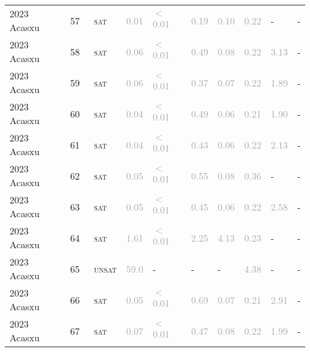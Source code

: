 \begin{center}
{\begin{longtable}{@{}llllllllll@{}}
2023 Acasxu & 57 & ~\textsc{sat} & \textcolor{darkgray}{0.01} & \textcolor{darkgray}{$<$0.01} & \textcolor{darkgray}{0.19} & \textcolor{darkgray}{0.10} & \textcolor{darkgray}{0.22} & - & - \\
2023 Acasxu & 58 & ~\textsc{sat} & \textcolor{darkgray}{0.06} & \textcolor{darkgray}{$<$0.01} & \textcolor{darkgray}{0.49} & \textcolor{darkgray}{0.08} & \textcolor{darkgray}{0.22} & \textcolor{darkgray}{3.13} & - \\
2023 Acasxu & 59 & ~\textsc{sat} & \textcolor{darkgray}{0.06} & \textcolor{darkgray}{$<$0.01} & \textcolor{darkgray}{0.37} & \textcolor{darkgray}{0.07} & \textcolor{darkgray}{0.22} & \textcolor{darkgray}{1.89} & - \\
2023 Acasxu & 60 & ~\textsc{sat} & \textcolor{darkgray}{0.04} & \textcolor{darkgray}{$<$0.01} & \textcolor{darkgray}{0.49} & \textcolor{darkgray}{0.06} & \textcolor{darkgray}{0.21} & \textcolor{darkgray}{1.90} & - \\
2023 Acasxu & 61 & ~\textsc{sat} & \textcolor{darkgray}{0.04} & \textcolor{darkgray}{$<$0.01} & \textcolor{darkgray}{0.43} & \textcolor{darkgray}{0.06} & \textcolor{darkgray}{0.22} & \textcolor{darkgray}{2.13} & - \\
2023 Acasxu & 62 & ~\textsc{sat} & \textcolor{darkgray}{0.05} & \textcolor{darkgray}{$<$0.01} & \textcolor{darkgray}{0.55} & \textcolor{darkgray}{0.08} & \textcolor{darkgray}{0.36} & - & - \\
2023 Acasxu & 63 & ~\textsc{sat} & \textcolor{darkgray}{0.05} & \textcolor{darkgray}{$<$0.01} & \textcolor{darkgray}{0.45} & \textcolor{darkgray}{0.06} & \textcolor{darkgray}{0.22} & \textcolor{darkgray}{2.58} & - \\
2023 Acasxu & 64 & ~\textsc{sat} & \textcolor{darkgray}{1.61} & \textcolor{darkgray}{$<$0.01} & \textcolor{darkgray}{2.25} & \textcolor{darkgray}{4.13} & \textcolor{darkgray}{0.23} & - & - \\
2023 Acasxu & 65 & ~\textsc{unsat} & \textcolor{darkgray}{59.0} & - & - & - & \textcolor{darkgray}{4.38} & - & - \\
2023 Acasxu & 66 & ~\textsc{sat} & \textcolor{darkgray}{0.05} & \textcolor{darkgray}{$<$0.01} & \textcolor{darkgray}{0.69} & \textcolor{darkgray}{0.07} & \textcolor{darkgray}{0.21} & \textcolor{darkgray}{2.91} & - \\
2023 Acasxu & 67 & ~\textsc{sat} & \textcolor{darkgray}{0.07} & \textcolor{darkgray}{$<$0.01} & \textcolor{darkgray}{0.47} & \textcolor{darkgray}{0.08} & \textcolor{darkgray}{0.22} & \textcolor{darkgray}{1.99} & - \\

\end{longtable}}
\end{center}
